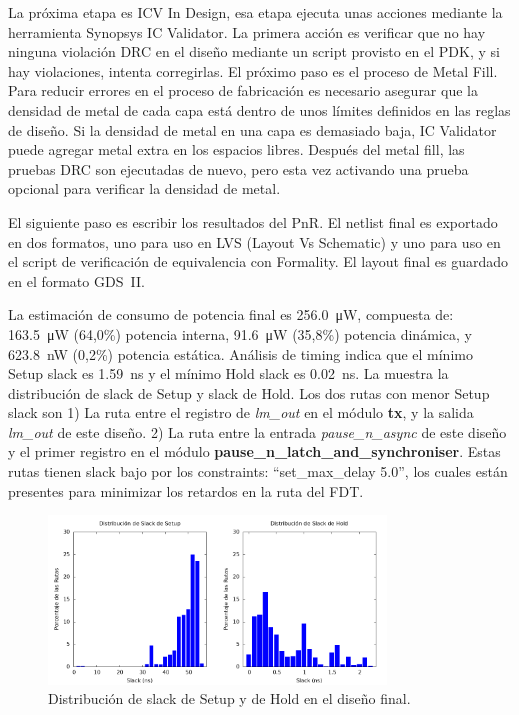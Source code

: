 \documentclass[a4paper, twoside, 11pt]{report}
\begin{document}
La próxima etapa es ICV In Design, esa etapa ejecuta unas acciones mediante la herramienta Synopsys IC Validator. La primera acción es verificar que no hay ninguna violación DRC en el diseño mediante un script provisto en el PDK, y si hay violaciones, intenta corregirlas. El próximo paso es el proceso de Metal Fill. Para reducir errores en el proceso de fabricación es necesario asegurar que la densidad de metal de cada capa está dentro de unos límites definidos en las reglas de diseño. Si la densidad de metal en una capa es demasiado baja, IC Validator puede agregar metal extra en los espacios libres. Después del metal fill, las pruebas DRC son ejecutadas de nuevo, pero esta vez activando una prueba opcional para verificar la densidad de metal.

El siguiente paso es escribir los resultados del PnR. El netlist final es exportado en dos formatos, uno para uso en LVS (Layout Vs Schematic) y uno para uso en el script de verificación de equivalencia con Formality. El layout final es guardado en el formato GDS~II.

La estimación de consumo de potencia final es \SI{256.0}{\micro\watt}, compuesta de: \SI{163.5}{\micro\watt} (64,0\%) potencia interna, \SI{91.6}{\micro\watt} (35,8\%) potencia dinámica, y \SI{623.8}{\nano\watt} (0,2\%) potencia estática. Análisis de timing indica que el mínimo Setup slack es \SI{1,59}{\nano\second} y el mínimo Hold slack es \SI{0.02}{\nano\second}. La  muestra la distribución de slack de Setup y slack de Hold. Los dos rutas con menor Setup slack son 1) La ruta entre el registro de \textit{lm\_out} en el módulo \textbf{tx}, y la salida \textit{lm\_out} de este diseño. 2) La ruta entre la entrada \textit{pause\_n\_async} de este diseño y el primer registro en el módulo \textbf{pause\_n\_latch\_and\_synchroniser}. Estas rutas tienen slack bajo por los constraints: “set\_max\_delay 5.0”, los cuales están presentes para minimizar los retardos en la ruta del FDT.

\begin{figure}[htb]
  \centering
  \includegraphics[width=0.8\textwidth]{./img/slack}
  \caption{Distribución de slack de Setup y de Hold en el diseño final.}
  \label{fig:setup_hold_slack}
\end{figure}
\end{document}
